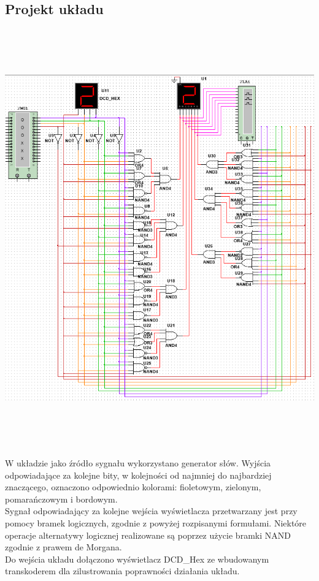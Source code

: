 \documentclass{article}
\begin{document}
        \subsection{Projekt układu}
            \begin{center}
                \includegraphics[height=18cm]{reports/img/Z1C_1.png}\\
            \end{center}
            W układzie jako źródło sygnału wykorzystano generator słów. Wyjścia odpowiadające za kolejne bity, w kolejności od najmniej do najbardziej znaczącego, oznaczono odpowiednio kolorami: fioletowym, zielonym, pomarańczowym i bordowym. \\
            Sygnał odpowiadający za kolejne wejścia wyświetlacza przetwarzany jest przy pomocy bramek logicznych, zgodnie z powyżej rozpisanymi formułami. Niektóre operacje alternatywy logicznej realizowane są poprzez użycie bramki NAND zgodnie z prawem de Morgana. \\
            Do wejścia układu dołączono wyświetlacz DCD\_Hex ze wbudowanym transkoderem dla zilustrowania poprawności działania układu.
            
\end{document}
